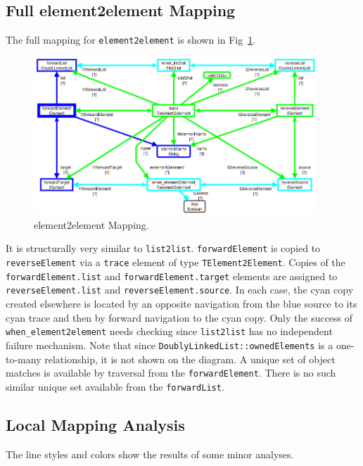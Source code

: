 \documentclass{llncs}
\begin{document}
\subsection{Full element2element Mapping}

The full mapping for \verb$element2element$ is shown in Fig~\ref{fig:element2element Mapping}.

\begin{figure}[h]
	\centering
	\includegraphics[width=0.95\textwidth]{element2element.png}
	\caption{element2element Mapping.}
	\label{fig:element2element Mapping}
\end{figure}

It is structurally very similar to \verb$list2list$. \verb$forwardElement$ is copied to \verb$reverseElement$ via a \verb$trace$ element of type \verb$TElement2Element$. Copies of the \verb$forwardElement.list$ and  \verb$forwardElement.target$ elements are assigned to \verb$reverseElement.list$ and \verb$reverseElement.source$. In each case, the cyan copy created elsewhere is located by an opposite navigation from the blue source to its cyan trace and then by forward navigation to the cyan copy. Only the success of \verb$when_element2element$ needs checking since \verb$list2list$ has no independent failure mechanism. Note that since \verb$DoublyLinkedList::ownedElements$ is a one-to-many relationship, it is not shown on the diagram. A unique set of object matches is available by traversal from the \verb$forwardElement$. There is no such similar unique set available from the \verb$forwardList$.

\subsection{Local Mapping Analysis}

The line styles and colors show the results of some minor analyses.
\end{document}
